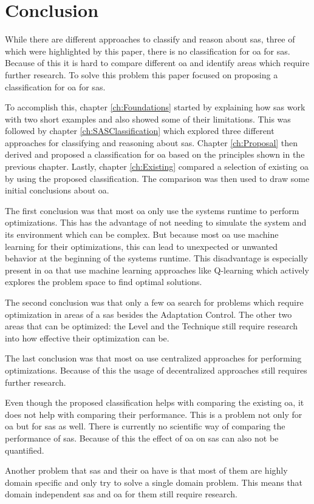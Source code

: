 \newpage
\section{Conclusion}
\label{ch:Conclusion}

While there are different approaches to classify and reason about \acrshort{sas}, three of which were highlighted by this paper,
there is no classification for \acrshort{oa} for \acrshort{sas}.
Because of this it is hard to compare different \acrshort{oa} and identify areas which require further research.
To solve this problem this paper focused on proposing a classification for \acrshort{oa} for \acrshort{sas}.

\noindent To accomplish this, chapter \ref{ch:Foundations} started by explaining how \acrshort{sas} work with two short examples
and also showed some of their limitations.
This was followed by chapter \ref{ch:SASClassification} which explored three different approaches
for classifying and reasoning about \acrshort{sas}.
Chapter \ref{ch:Proposal} then derived and proposed a classification for \acrshort{oa} based on the principles shown in the previous chapter.
Lastly, chapter \ref{ch:Existing} compared a selection of existing \acrshort{oa} by using the proposed classification.
The comparison was then used to draw some initial conclusions about \acrshort{oa}.

\noindent The first conclusion was that most \acrshort{oa} only use the systems runtime to perform optimizations.
This has the advantage of not needing to simulate the system and its environment which can be complex.
But because most \acrshort{oa} use machine learning for their optimizations,
this can lead to unexpected or unwanted behavior at the beginning of the systems runtime.
This disadvantage is especially present in \acrshort{oa} that use machine learning approaches
like Q-learning which actively explores the problem space to find optimal solutions.

\noindent The second conclusion was that only a few \acrshort{oa} search for problems which require optimization in areas of a \acrshort{sas}
besides the Adaptation Control. The other two areas that can be optimized: the Level and the Technique still require
research into how effective their optimization can be.

\noindent The last conclusion was that most \acrshort{oa} use centralized approaches for performing optimizations.
Because of this the usage of decentralized approaches still requires further research.

\noindent Even though the proposed classification helps with comparing the existing \acrshort{oa},
it does not help with comparing their performance.
This is a problem not only for \acrshort{oa} but for \acrshort{sas} as well.
There is currently no scientific way of comparing the performance of \acrshort{sas}.
Because of this the effect of \acrshort{oa} on \acrshort{sas} can also not be quantified.

\noindent Another problem that \acrshort{sas} and their \acrshort{oa} have is that
most of them are highly domain specific and only try to solve a single domain problem.
This means that domain independent \acrshort{sas} and \acrshort{oa} for them still require research.